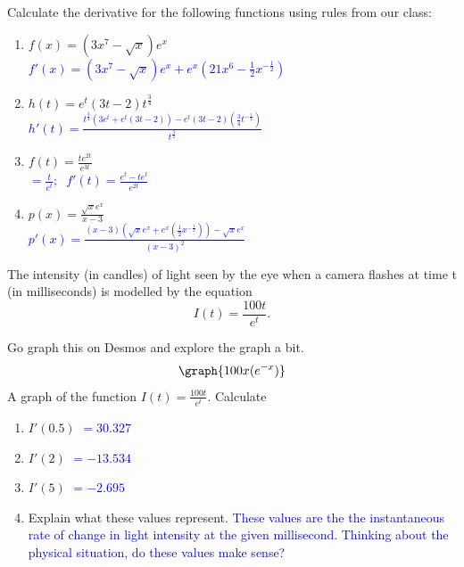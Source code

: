 \documentclass{ximera}
\begin{document}
\begin{exercise}
    Calculate the derivative for the following functions using rules from our class: 
        \begin{enumerate}
            \item $f(x)=(3x^7-\sqrt{x})e^x$\\
            \textcolor{blue}{ $f'(x)=(3x^7-\sqrt{x})e^x+e^x(21x^6-\frac{1}{2}x^{-\frac{1}{2}})$}
       
            \item $h(t)=e^t(3t-2)t^{\frac{3}{4}}$\\
            \textcolor{blue}{ $h'(t)=\frac{t^{\frac{3}{4}}(3e^t+e^t(3t-2))-e^t(3t-2)(\frac{3}{4}t^{-\frac{1}{4}})}{t^{\frac{3}{2}}}$}
       
            \item $f(t)=\frac{te^{2t}}{e^{3t}}$\\
            \textcolor{blue}{ $=\frac{t}{e^t};\;\; f'(t)=\frac{e^t-te^t}{e^{2t}}$}
        
            \item $p(x)=\frac{\sqrt{x}e^x}{x-3}$\\
            \textcolor{blue}{ $p'(x)=\frac{(x-3)(\sqrt{x}e^x+e^x(\frac{1}{2}x^{-\frac{1}{2}}))-\sqrt{x}e^x}{(x-3)^2}$}
        \end{enumerate}
\end{exercise}

\begin{exercise}
    The intensity (in candles) of light seen by the eye when a camera flashes at time t (in milliseconds) is modelled by the equation
        $$I(t)=\frac{100t}{e^t}.$$
      
    Go graph this on Desmos and explore the graph a bit.
        \[
        \graph{100x(e^{-x})}
        \]
    \xmalt A graph of the function $I(t)=\frac{100t}{e^t}$.
    Calculate 
    \begin{enumerate}
        \item[a.] $I'(0.5)$ 
        \textcolor{blue}{$=30.327$}
        \item[b.] $I'(2)$
        \textcolor{blue}{ $=-13. 534$}
        \item[c.] $I'(5)$
        \textcolor{blue}{ $=-2.695$}
        \item[d.] Explain what these values represent. 
        \textcolor{blue}{ These values are the the instantaneous rate of change in light intensity at the given millisecond. Thinking about the physical situation, do these values make sense?}
\end{enumerate}

\end{exercise}
\end{document}
